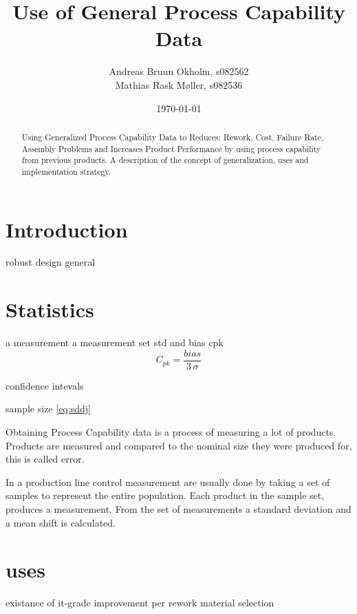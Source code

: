\documentclass[aip,amsmath,reprint, author-year]{revtex4-1}
\begin{document}
\begin{abstract}
Using Generalized Process Capability Data to Reduces: Rework, Cost, Failure Rate, Assembly Problems and Increases Product Performance by using process capability from previous products.
A description of the concept of generalization, uses and implementation strategy.
\end{abstract}

\title{Use of General Process Capability Data}
\author{Andreas Bruun Okholm, s082562\\
Mathias Rask Møller, s082536 }
 
\date{\today}
\maketitle


\section{Introduction}

robust design general


\section{Statistics}

a measurement
a measurement set
std and bias
cpk 
\begin{equation}
C_{pk} = \frac{bias}{3 \, \sigma}
\label{eq:sddj}
\end{equation}

confidence intevals

sample size  \ref{eq:sddj}





Obtaining Process Capability data is a process of measuring a lot of products.
Products are measured and compared to the nominal size they were produced for, this is called error.

In a production line control measurement are usually done by taking a set of samples to represent the entire population. Each product in the sample set, produces a measurement. From the set of measurements a standard deviation and a mean shift is calculated.

\section{uses}
existance of it-grade
improvement per rework
material selection
\end{document}
